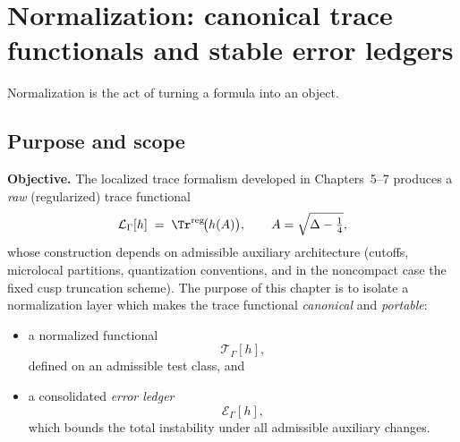 
\chapter{Normalization: canonical trace functionals and stable error ledgers}
\label{chap:08-normalization}

\epigraph{Normalization is the act of turning a formula into an object.}{}

\section{Purpose and scope}\label{sec:08.scope}

\noindent\textbf{Objective.}
The localized trace formalism developed in Chapters~5--7 produces a \emph{raw} (regularized) trace functional
\[
\mathcal L_\Gamma[h]\;=\;\Tr^{\mathrm{reg}}\!\big(h(A)\big),
\qquad A=\sqrt{\Delta-\tfrac14},
\]
whose construction depends on admissible auxiliary architecture (cutoffs, microlocal partitions, quantization conventions,
and in the noncompact case the fixed cusp truncation scheme). The purpose of this chapter is to isolate a normalization layer
which makes the trace functional \emph{canonical} and \emph{portable}:

\begin{itemize}
\item a normalized functional
\[
\mathcal T_\Gamma[h],
\]
defined on an admissible test class, and
\item a consolidated \emph{error ledger}
\[
\mathcal E_\Gamma[h],
\]
which bounds the total instability under all admissible auxiliary changes.
\end{itemize}


